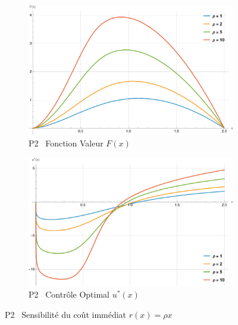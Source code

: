 \begin{figure}[htb]
    \centering
    \begin{subfigure}{0.49\linewidth}
        \includegraphics[width=\linewidth]{img/validation/P2/p2_R_value.pdf}
        \caption{P2 \textemdash~Fonction Valeur $F(x)$}\label{fig:RhoValueVisualisation2}
    \end{subfigure}
    \hfill
    \begin{subfigure}{0.49\linewidth}
        \includegraphics[width=\linewidth]{img/validation/P2/p2_R_control.pdf}
        \caption{P2 \textemdash~Contrôle Optimal $u^*(x)$}\label{fig:RhoControlVisualisation2}
    \end{subfigure}
    \caption{P2 \textemdash~Sensibilité du coût immédiat $r(x)=\rho x$}\label{fig:RhoValueControlComparison2}
\end{figure}
